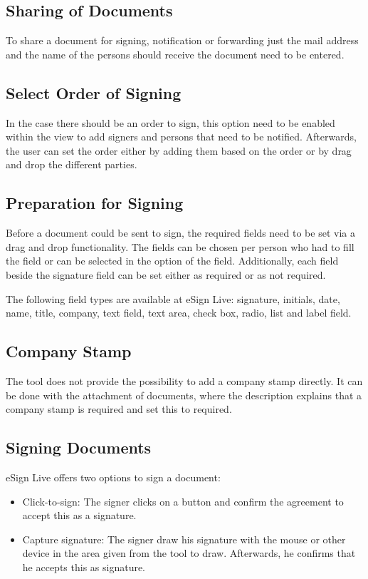\subsection{Sharing of Documents}
To share a document for signing, notification or forwarding just the mail address and the name of the persons should receive the document need to be entered.

\subsection{Select Order of Signing}
In the case there should be an order to sign, this option need to be enabled within the view to add signers and persons that need to be notified. Afterwards, the user can set the order either by adding them based on the order or by drag and drop the different parties.

\subsection{Preparation for Signing}
Before a document could be sent to sign, the required fields need to be set via a drag and drop functionality. The fields can be chosen per person who had to fill the field or can be selected in the option of the field. Additionally, each field beside the signature field can be set either as required or as not required.

The following field types are available at eSign Live: signature, initials, date, name, title, company, text field, text area, check box, radio, list and label field.

\subsection{Company Stamp}
The tool does not provide the possibility to add a company stamp directly. It can be done with the attachment of documents, where the description explains that a company stamp is required and set this to required.

\subsection{Signing Documents}
eSign Live offers two options to sign a document:
\begin{itemize}
	\item Click-to-sign: The signer clicks on a button and confirm the agreement to accept this as a signature.
	\item  Capture signature: The signer draw his signature with the mouse or other device in  the area given from the tool to draw. Afterwards, he confirms that he accepts this as signature.
\end{itemize}

